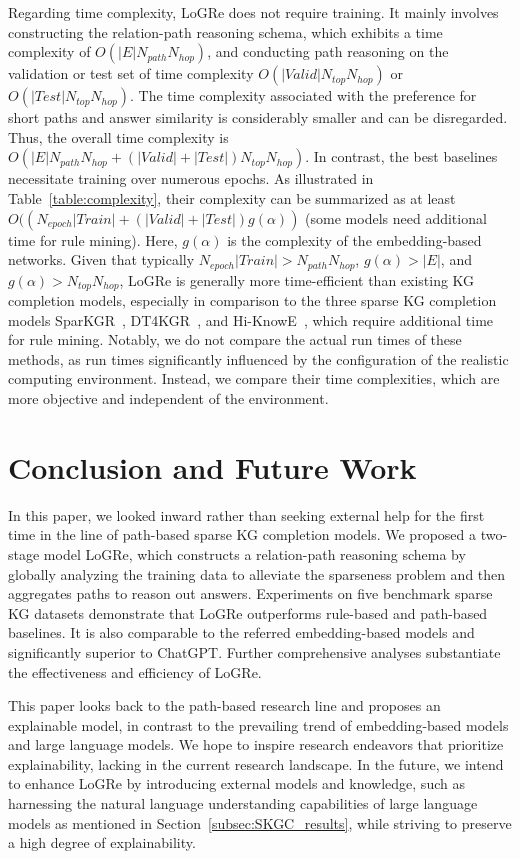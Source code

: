 \documentclass[sigconf]{acmart}
\begin{document}
Regarding time complexity, LoGRe does not require training. It mainly involves constructing the relation-path reasoning schema, which exhibits a time complexity of $O(|E| N_{path} N_{hop})$, and conducting path reasoning on the validation or test set of time complexity $O(|Valid| N_{top} N_{hop})$ or $O(|Test| N_{top} N_{hop})$. The time complexity associated with the preference for short paths and answer similarity is considerably smaller and can be disregarded. Thus, the overall time complexity is $O(|E| N_{path} N_{hop} + (|Valid| + |Test|) N_{top} N_{hop})$. In contrast, the best baselines necessitate training over numerous epochs. As illustrated in Table~\ref{table:complexity}, their complexity can be summarized as at least $O((N_{epoch} |Train| + (|Valid| + |Test|) g(\alpha))$ (some models need additional time for rule mining). Here, $g(\alpha)$ is the complexity of the embedding-based networks. Given that typically $N_{epoch}|Train| > N_{path}N_{hop}$, $g(\alpha) > |E|$, and $g(\alpha) > N_{top} N_{hop}$, LoGRe is generally more time-efficient than existing KG completion models, especially in comparison to the three sparse KG completion models SparKGR~\cite{SparKGR}, DT4KGR~\cite{DT4KGR}, and Hi-KnowE~\cite{Hi-KnowE}, which require additional time for rule mining. Notably, we do not compare the actual run times of these methods, as run times significantly influenced by the configuration of the realistic computing environment. Instead, we compare their time complexities, which are more objective and independent of the environment.

\section{Conclusion and Future Work}
\label{sec:conclusion_futurework}
In this paper, we looked inward rather than seeking external help for the first time in the line of path-based sparse KG completion models. We proposed a two-stage model LoGRe, which constructs a relation-path reasoning schema by globally analyzing the training data to alleviate the sparseness problem and then aggregates paths to reason out answers. Experiments on five benchmark sparse KG datasets demonstrate that LoGRe outperforms rule-based and path-based baselines. It is also comparable to the referred embedding-based models and significantly superior to ChatGPT. Further comprehensive analyses substantiate the effectiveness and efficiency of LoGRe.

This paper looks back to the path-based research line and proposes an explainable model, in contrast to the prevailing trend of embedding-based models and large language models. We hope to inspire research endeavors that prioritize explainability, lacking in the current research landscape. In the future, we intend to enhance LoGRe by introducing external models and knowledge, such as harnessing the natural language understanding capabilities of large language models as mentioned in Section~\ref{subsec:SKGC_results}, while striving to preserve a high degree of explainability.
\end{document}
